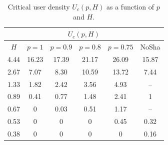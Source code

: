 \documentclass[conference]{IEEEtran}
\begin{document}
\begin{table}[t!]
\caption{Critical user density $U_{c}(p,H)$ as a function of $p$ and $H$.}%
\begin{center}
\vspace{-1ex}
\begin{tabular}{|c|c|c|c|c|c|}
\hline
\multicolumn{6}{|c|}{$U_c(p,H)$}\\
\hline
$H$ & $p=1$ & $p=0.9$ & $p=0.8$ & $p=0.75$ & NoSha \cite{cali2018percolation} \\
\hline
4.44 & 16.23 & 17.39 & 21.17  & 26.09 & 15.87 \\
2.67 & 7.07  & 8.30 & 10.59 & 13.72 &  7.44 \\
1.33 & 1.82 & 2.42 & 3.56 &  4.93 &  -- \\
0.89 & 0.41  & 0.77 & 1.48 & 2.41 &  1  \\
0.67 & 0  & 0.03 & 0.51 &  1.17 &  -- \\
0.53 & 0  & 0 & 0 & 0.45 & 0.32 \\
0.38 & 0 & 0 & 0 & 0 & 0.16 \\
\hline
\end{tabular}
\label{tab-critical-U}
\end{center}
\vspace{-4ex}
\end{table}
\end{document}
